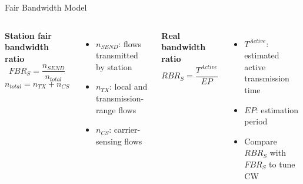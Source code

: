 \begin{frame}{Fair Bandwidth Model}

\begin{columns}[T,onlytextwidth]
\textbf{Station fair bandwidth ratio}
\[
FBR_S = \frac{n_{SEND}}{n_{total}}
\]
\[
n_{total} = n_{TX} + n_{CS}
\]
\begin{itemize}
    \item $n_{SEND}$: flows transmitted by station
    \item $n_{TX}$: local and transmission-range flows
    \item $n_{CS}$: carrier-sensing flows
\end{itemize}

\textbf{Real bandwidth ratio}
\[
RBR_S = \frac{T^{Active}}{EP}
\]
\begin{itemize}
    \item $T^{Active}$: estimated active transmission time
    \item $EP$: estimation period
    \item Compare $RBR_S$ with $FBR_S$ to tune CW
\end{itemize}
\end{columns}
\end{frame}
